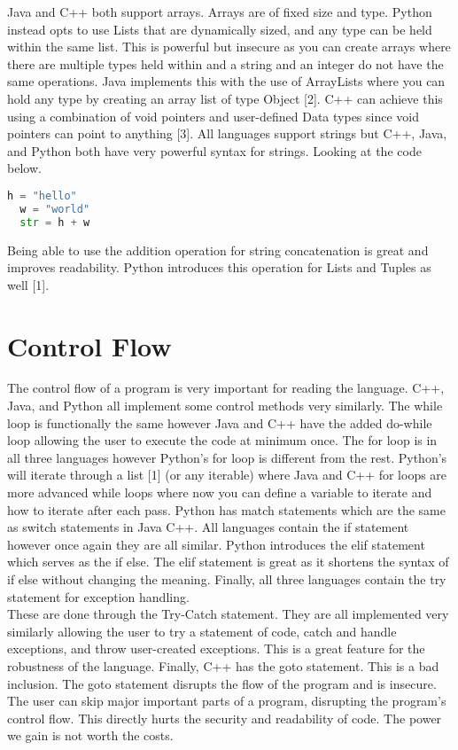 \documentclass[sigconf, nonacm, authorversion, language=english, 12pt]{acmart}
\def\tab{\hspace*{5mm}}
\begin{document}
\tab Java and C++ both support arrays. Arrays are of fixed size and type. Python instead opts to use Lists that are dynamically sized, and any type can be held within the same list. This is powerful but insecure
as you can create arrays where there are multiple types held within and a string and an integer do not have the same operations. Java implements this with the use of ArrayLists where you can hold any type
by creating an array list of type Object [2]. C++ can achieve this using a combination of void pointers and user-defined Data types since void pointers can point to anything [3]. All languages support strings but
C++, Java, and Python both have very powerful syntax for strings. Looking at the code below.\\
\begin{lstlisting}[language=Python]
  h = "hello"
  w = "world"
  str = h + w  
\end{lstlisting}
Being able to use the addition operation for string concatenation is great and improves readability. Python introduces this operation for Lists and Tuples as well [1].

\section{Control Flow}
\tab The control flow of a program is very important for reading the language. C++, Java, and Python all implement some control methods very similarly. The while loop is functionally the same however Java and C++
have the added do-while loop allowing the user to execute the code at minimum once. The for loop is in all three languages however Python's for loop is different from the rest. Python's will iterate through a list [1] (or any iterable)
where Java and C++ for loops are more advanced while loops where now you can define a variable to iterate and how to iterate after each pass. Python has match statements which are the same as switch statements in Java
C++. All languages contain the if statement however once again they are all similar. Python introduces the elif statement which serves as the if else. The elif statement is great as it shortens the syntax of if else without
changing the meaning. Finally, all three languages contain the try statement for exception handling.\\

\tab These are done through the Try-Catch statement. They are all implemented very similarly allowing the user to try a statement of code, catch and handle
exceptions, and throw user-created exceptions. This is a great feature for the robustness of the language. Finally, C++ has the goto statement.
This is a bad inclusion. The goto statement disrupts the flow of the program
and is insecure. The user can skip major important parts of a program, disrupting the program's control flow. This directly hurts the security and readability of code. The power
we gain is not worth the costs.\\
\end{document}
